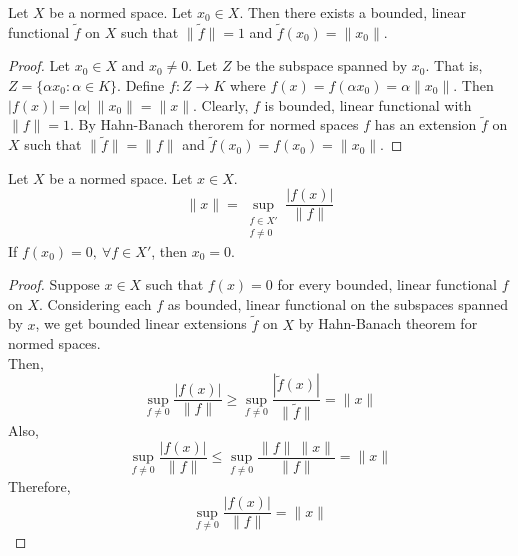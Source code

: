 \begin{theorem}
	Let $X$ be a normed space.
	Let $x_0 \in X$.
	Then there exists a bounded, linear functional $\tilde{f}$ on $X$ such that $\|\tilde{f}\| = 1$ and $\tilde{f}(x_0) = \|x_0\|$.
\end{theorem}
\begin{proof}
	Let $x_0 \in X$ and $x_0 \ne 0$.
	Let $Z$ be the subspace spanned by $x_0$.
	That is, $Z = \{ \alpha x_0 : \alpha \in K\}$.
	Define $f : Z \to K$ where $f(x) = f(\alpha x_0) = \alpha \|x_0\|$.
	Then $|f(x)| = |\alpha| \ \|x_0\| = \|x\|$.
	Clearly, $f$ is bounded, linear functional with $\|f\|=1$.
	By Hahn-Banach therorem for normed spaces $f$ has an extension $\tilde{f}$ on $X$ such that $\|\tilde{f}\| = \|f\|$ and $\tilde{f}(x_0) = f(x_0) = \|x_0\|$.
\end{proof}

\begin{corollary}
	Let $X$ be a normed space.
	Let $x \in X$.
	\[ \|x\| = \sup_{\substack{f \in X'\\ f \ne 0}} \frac{|f(x)|}{\|f\|} \]
	If $f(x_0) = 0,\ \forall f \in X'$, then $x_0 = 0$.
\end{corollary}
\begin{proof}
	Suppose $x \in X$ such that $f(x) = 0$ for every bounded, linear functional $f$ on $X$.
	Considering each $f$ as bounded, linear functional on the subspaces spanned by $x$, we get bounded linear extensions $\tilde{f}$ on $X$ by Hahn-Banach theorem for normed spaces.	\\

	Then,
	\[ \sup_{f \ne 0} \frac{|f(x)|}{\|f\|} \ge \sup_{f \ne 0} \frac{|\tilde{f}(x)|}{\|\tilde{f}\|} = \|x\| \]
	Also,
	\[ \sup_{f \ne 0} \frac{|f(x)|}{\|f\|} \le \sup_{f \ne 0} \frac{\|f\| \ \|x\|}{\|f\|} = \|x\| \]
	Therefore, 
	\[ \sup_{f \ne 0} \frac{|f(x)|}{\|f\|} = \|x\| \]
\end{proof}

\setcounter{subsection}{4}
